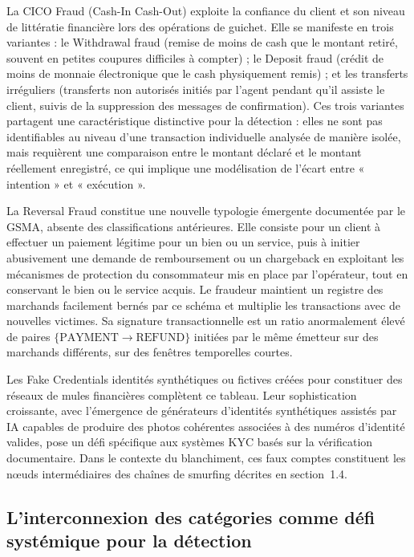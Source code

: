 \documentclass[11pt,a4paper,oneside]{report}
\theoremstyle{definition}
\theoremstyle{remark}
\begin{document}
La CICO Fraud (Cash-In Cash-Out) exploite la confiance du client et son niveau de littératie financière lors des opérations de guichet. Elle se manifeste en trois variantes : le Withdrawal fraud (remise de moins de cash que le montant retiré, souvent en petites coupures difficiles à compter) ; le Deposit fraud (crédit de moins de monnaie électronique que le cash physiquement remis) ; et les transferts irréguliers (transferts non autorisés initiés par l'agent pendant qu'il assiste le client, suivis de la suppression des messages de confirmation). Ces trois variantes partagent une caractéristique distinctive pour la détection : elles ne sont pas identifiables au niveau d'une transaction individuelle analysée de manière isolée, mais requièrent une comparaison entre le montant déclaré et le montant réellement enregistré, ce qui implique une modélisation de l'écart entre « intention » et « exécution ».

La Reversal Fraud constitue une nouvelle typologie émergente documentée par le GSMA, absente des classifications antérieures. Elle consiste pour un client à effectuer un paiement légitime pour un bien ou un service, puis à initier abusivement une demande de remboursement ou un chargeback en exploitant les mécanismes de protection du consommateur mis en place par l'opérateur, tout en conservant le bien ou le service acquis. Le fraudeur maintient un registre des marchands facilement bernés par ce schéma et multiplie les transactions avec de nouvelles victimes. Sa signature transactionnelle est un ratio anormalement élevé de paires $\{\text{PAYMENT} \rightarrow \text{REFUND}\}$ initiées par le même émetteur sur des marchands différents, sur des fenêtres temporelles courtes.

Les Fake Credentials  identités synthétiques ou fictives créées pour constituer des réseaux de mules financières  complètent ce tableau. Leur sophistication croissante, avec l'émergence de générateurs d'identités synthétiques assistés par IA capables de produire des photos cohérentes associées à des numéros d'identité valides, pose un défi spécifique aux systèmes KYC basés sur la vérification documentaire. Dans le contexte du blanchiment, ces faux comptes constituent les nœuds intermédiaires des chaînes de smurfing décrites en section~1.4.

\subsection{L'interconnexion des catégories comme défi systémique pour la détection}
\end{document}
